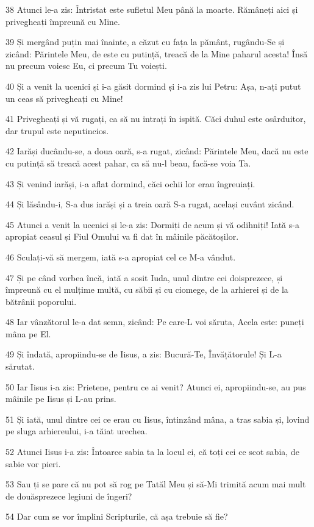 \par 38 Atunci le-a zis: Întristat este sufletul Meu până la moarte. Rămâneți aici și privegheați împreună cu Mine.
\par 39 Și mergând puțin mai înainte, a căzut cu fața la pământ, rugându-Se și zicând: Părintele Meu, de este cu putință, treacă de la Mine paharul acesta! Însă nu precum voiesc Eu, ci precum Tu voiești.
\par 40 Și a venit la ucenici și i-a găsit dormind și i-a zis lui Petru: Așa, n-ați putut un ceas să privegheați cu Mine!
\par 41 Privegheați și vă rugați, ca să nu intrați în ispită. Căci duhul este osârduitor, dar trupul este neputincios.
\par 42 Iarăși ducându-se, a doua oară, s-a rugat, zicând: Părintele Meu, dacă nu este cu putință să treacă acest pahar, ca să nu-l beau, facă-se voia Ta.
\par 43 Și venind iarăși, i-a aflat dormind, căci ochii lor erau îngreuiați.
\par 44 Și lăsându-i, S-a dus iarăși și a treia oară S-a rugat, același cuvânt zicând.
\par 45 Atunci a venit la ucenici și le-a zis: Dormiți de acum și vă odihniți! Iată s-a apropiat ceasul și Fiul Omului va fi dat în mâinile păcătoșilor.
\par 46 Sculați-vă să mergem, iată s-a apropiat cel ce M-a vândut.
\par 47 Și pe când vorbea încă, iată a sosit Iuda, unul dintre cei doisprezece, și împreună cu el mulțime multă, cu săbii și cu ciomege, de la arhierei și de la bătrânii poporului.
\par 48 Iar vânzătorul le-a dat semn, zicând: Pe care-L voi săruta, Acela este: puneți mâna pe El.
\par 49 Și îndată, apropiindu-se de Iisus, a zis: Bucură-Te, Învățătorule! Și L-a sărutat.
\par 50 Iar Iisus i-a zis: Prietene, pentru ce ai venit? Atunci ei, apropiindu-se, au pus mâinile pe Iisus și L-au prins.
\par 51 Și iată, unul dintre cei ce erau cu Iisus, întinzând mâna, a tras sabia și, lovind pe sluga arhiereului, i-a tăiat urechea.
\par 52 Atunci Iisus i-a zis: Întoarce sabia ta la locul ei, că toți cei ce scot sabia, de sabie vor pieri.
\par 53 Sau ți se pare că nu pot să rog pe Tatăl Meu și să-Mi trimită acum mai mult de douăsprezece legiuni de îngeri?
\par 54 Dar cum se vor împlini Scripturile, că așa trebuie să fie?

